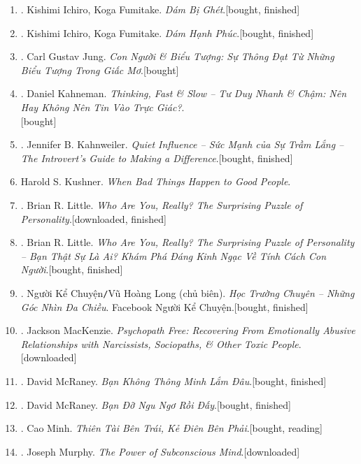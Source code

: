\documentclass{article}
\begin{document}
\begin{enumerate}
	\item \cite{Ichiro_Fumitake2022a}. Kishimi Ichiro, Koga Fumitake. \textit{Dám Bị Ghét}.\hfill\textsf{[bought, finished]}
	\item \cite{Ichiro_Fumitake2022b}. Kishimi Ichiro, Koga Fumitake. \textit{Dám Hạnh Phúc}.\hfill\textsf{[bought, finished]}
	\item \cite{Jung2022}. Carl Gustav Jung. \textit{Con Người \& Biểu Tượng: Sự Thông Đạt Từ Những Biểu Tượng Trong Giấc Mơ}.\hfill\textsf{[bought]}
	\item \cite{Kahneman2022}. Daniel Kahneman. \textit{Thinking, Fast \& Slow -- Tư Duy Nhanh \& Chậm: Nên Hay Không Nên Tin Vào Trực Giác?}.\\\mbox{}\hfill\textsf{[bought]}
	\item \cite{Kahnweiler2022}. Jennifer B. Kahnweiler. \textit{Quiet Influence -- Sức Mạnh của Sự Trầm Lắng -- The Introvert's Guide to Making a Difference}.\hfill\textsf{[bought, finished]}
	\item Harold S. Kushner. \textit{When Bad Things Happen to Good People}.
	\item \cite{Little2017}. Brian R. Little. \textit{Who Are You, Really? The Surprising Puzzle of Personality}.\hfill\textsf{[downloaded, finished]}
	\item \cite{Little2023}. Brian R. Little. \textit{Who Are You, Really? The Surprising Puzzle of Personality -- Bạn Thật Sự Là Ai? Khám Phá Đáng Kinh Ngạc Về Tính Cách Con Người}.\hfill\textsf{[bought, finished]}
	\item \cite{Long_2021}. Người Kể Chuyện\texttt{/}Vũ Hoàng Long (chủ biên). \textit{Học Trường Chuyên -- Những Góc Nhìn Đa Chiều}. Facebook Người Kể Chuyện.\hfill\textsf{[bought, finished]}
	\item \cite{MacKenzie2015}. Jackson MacKenzie. \textit{Psychopath Free: Recovering From Emotionally Abusive Relationships with Narcissists, Sociopaths, \& Other Toxic People}.\hfill\textsf{[downloaded]}
	\item \cite{McRaney2022a}. David McRaney. \textit{Bạn Không Thông Minh Lắm Đâu}.\hfill\textsf{[bought, finished]}
	\item \cite{McRaney2022b}. David McRaney. \textit{Bạn Đỡ Ngu Ngơ Rồi Đấy}.\hfill\textsf{[bought, finished]}		
	\item \cite{Minh2022}. Cao Minh. \textit{Thiên Tài Bên Trái, Kẻ Điên Bên Phải}.\hfill\textsf{[bought, reading]}
	\item \cite{Murphy2011}. Joseph Murphy. \textit{The Power of Subconscious Mind}.\hfill\textsf{[downloaded]}

\end{enumerate}
\end{document}

